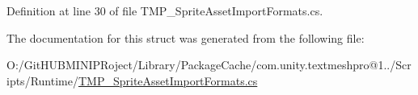 Definition at line 30 of file T\+M\+P\+\_\+\+Sprite\+Asset\+Import\+Formats.\+cs.



The documentation for this struct was generated from the following file\+:\begin{DoxyCompactItemize}
\item 
O\+:/\+Git\+H\+U\+B\+M\+I\+N\+I\+P\+Roject/\+Library/\+Package\+Cache/com.\+unity.\+textmeshpro@1../\+Scripts/\+Runtime/\mbox{\hyperlink{_t_m_p___sprite_asset_import_formats_8cs}{T\+M\+P\+\_\+\+Sprite\+Asset\+Import\+Formats.\+cs}}\end{DoxyCompactItemize}
